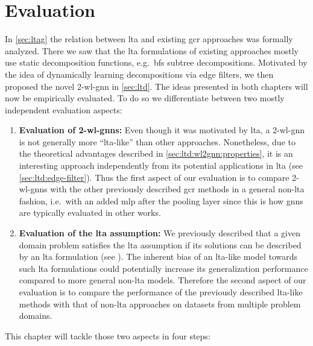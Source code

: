 \chapter{Evaluation}%
\label{sec:eval}

In \cref{sec:ltag} the relation between \ac{lta} and existing \ac{gcr} approaches was formally analyzed.
There we saw that the \ac{lta} formulations of existing approaches mostly use static decomposition functions, e.g.\ \ac{bfs} subtree decompositions.
Motivated by the idea of dynamically learning decompositions via edge filters, we then proposed the novel 2-\acs{wl}-\acs{gnn} in \cref{sec:ltd}.
The ideas presented in both chapters will now be empirically evaluated.
To do so we differentiate between two mostly independent evaluation aspects:
\begin{enumerate}[label={\textbf{\arabic*.}}]
	\item \textbf{Evaluation of 2-\acs{wl}-\acsp{gnn}:}
		Even though it was motivated by \ac{lta}, a 2-\acs{wl}-\acs{gnn} is not generally more ``\acs{lta}-like'' than other approaches.
		Nonetheless, due to the theoretical advantages described in \cref{sec:ltd:wl2gnn:properties}, it is an interesting approach independently from its potential applications in \ac{lta} (see \cref{sec:ltd:edge-filter}).
		Thus the first aspect of our evaluation is to compare 2-\acs{wl}-\acsp{gnn} with the other previously described \ac{gcr} methods in a general non-\acs{lta} fashion, i.e.\ with an added \ac{mlp} after the pooling layer since this is how \acp{gnn} are typically evaluated in other works.
	\item \textbf{Evaluation of the \ac{lta} assumption:}
		We previously described that a given domain problem satisfies the \ac{lta} assumption if its solutions can be described by an \ac{lta} formulation (see ).
		The inherent bias of an \acs{lta}-like model towards such \ac{lta} formulations could potentially increase its generalization performance compared to more general non-\acs{lta} models.
		Therefore the second aspect of our evaluation is to compare the performance of the previously described \acs{lta}-like methods with that of non-\acs{lta} approaches on datasets from multiple problem domains.
\end{enumerate}
This chapter will tackle those two aspects in four steps:
